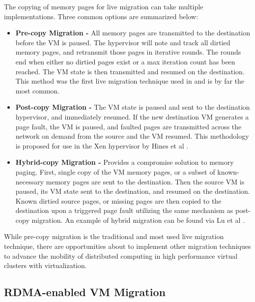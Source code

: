 The copying of memory pages for live migration can take multiple implementations. Three common options are summarized below:

\begin{itemize}
\item \textbf{Pre-copy Migration - }  All memory pages are transmitted to the destination before the VM is paused. The hypervisor will note and track all dirtied memory pages, and retransmit those pages in iterative rounds. The rounds end when either no dirtied pages exist or a max iteration count has been reached. The VM state is then transmitted and resumed on the destination. This method was the first live migration technique used in \cite{clark2005live} and is by far the most common. 
\item \textbf{Post-copy Migration - } The VM state is paused and sent to the destination hypervisor, and immediately resumed. If the new destination VM generates a page fault, the VM is paused, and faulted pages are transmitted across the network on demand from the source and the VM resumed.  This methodology is proposed for use in the Xen hypervisor by Hines et al \cite{hines2009post}. 
\item \textbf{Hybrid-copy Migration - } Provides a compromise solution to memory paging. First, single copy of the VM memory pages, or a subset of known-necessary memory pages are sent to the destination.  Then the source VM is paused, its VM state sent to the destination, and resumed on the destination.  Known dirtied source pages, or missing pages are then copied to the destination upon a triggered page fault utilizing the same mechanism as post-copy migration. An example of hybrid migration can be found via Lu et al \cite{Lu2013}. 
\end{itemize}

While pre-copy migration is the traditional and most used live migration technique, there are opportunities about to implement other migration techniques to advance the mobility of distributed computing in high performance virtual clusters with virtualization. 



\subsection{RDMA-enabled VM Migration}


